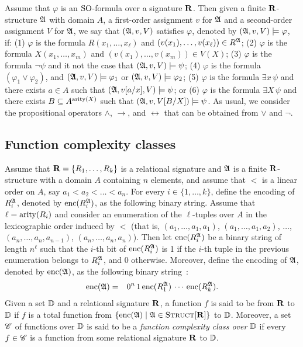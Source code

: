 Assume that $\varphi$ is an ${\rm SO}$-formula over a signature $\mathbf{R}$. Then given a finite $\mathbf{R}$-structure $\mathfrak{A}$ with domain $A$, a first-order assignment $v$ for $\mathfrak{A}$ and a second-order assignment $V$ for $\mathfrak{A}$, we say that $(\mathfrak{A}, v, V)$ satisfies $\varphi$, denoted by $(\mathfrak{A}, v, V) \models \varphi$, if: (1) $\varphi$ is the formula $R(x_1, \ldots, x_\ell)$ and $(v(x_1), \ldots, v(x_\ell)) \in R^{\mathfrak{A}}$; (2) $\varphi$ is the formula $X(x_1, \ldots, x_m)$ and $(v(x_1), \ldots, v(x_m)) \in V(X)$; (3) $\varphi$ is the formula $\neg \psi$ and it not the case that $(\mathfrak{A}, v, V) \models \psi$; (4) $\varphi$ is the formula $(\varphi_1 \vee \varphi_2)$, and $(\mathfrak{A}, v, V) \models \varphi_1$ or $(\mathfrak{A}, v, V) \models \varphi_2$; (5) $\varphi$ is the formula $\exists x \, \psi$ and there exists $a \in A$ such that $(\mathfrak{A}, v[a/x], V) \models \psi$; or (6) $\varphi$ is the formula $\exists X \, \psi$ and there exists $B \subseteq A^{{\rm arity}(X)}$ such that $(\mathfrak{A}, v, V[B/X]) \models \psi$.  As usual, we consider the propositional operators $\wedge$, $\rightarrow$, and $\leftrightarrow$ that can be obtained from $\vee$ and $\neg$. 

\subsection{Function complexity classes}
Assume that $\mathbf{R} = \{R_1, \ldots, R_k\}$ is a relational signature and $\mathfrak{A}$ is a finite $\mathbf{R}$-structure with a domain $A$ containing $n$ elements, and assume that  $<$ is a linear order on $A$, say $a_1 < a_2 < \ldots < a_n$. For every $i \in \{1, \ldots, k\}$, define the encoding of $R_i^{\mathfrak{A}}$, denoted by ${\rm enc}(R_i^{\mathfrak{A}})$, as the following binary string. Assume that $\ell = {\rm arity}(R_i)$ and consider an enumeration of the $\ell$-tuples over $A$ in the lexicographic order induced by $<$ (that is, $(a_1, \ldots, a_1, a_1)$, $(a_1, \ldots, a_1, a_2)$, $\ldots$, $(a_n, \ldots, a_n, a_{n-1})$, $(a_n, \ldots, a_n, a_n)$). Then let ${\rm enc}(R_i^{\mathfrak{A}})$ be a binary string of length $n^\ell$ such that the $i$-th bit of ${\rm enc}(R_i^{\mathfrak{A}})$ is 1 if the $i$-th tuple in the previous enumeration belongs to $R_i^{\mathfrak{A}}$, and 0 otherwise. Moreover, define the encoding of $\mathfrak{A}$, denoted by ${\rm enc}(\mathfrak{A})$, as the following binary string~\cite{L04}:
\begin{eqnarray*}
{\rm enc}(\mathfrak{A}) & = & 0^n \, 1 \, {\rm enc}(R_1^{\mathfrak{A}}) \, \cdots \, {\rm enc}(R_k^{\mathfrak{A}}).
\end{eqnarray*}
Given a set $\mathbb{D}$ and a relational signature $\mathbf{R}$, a function $f$ is said to be from $\mathbf{R}$ to $\mathbb{D}$ if $f$ is a total function from $\{{\rm enc}(\mathfrak{A}) \mid \mathfrak{A} \in \text{\sc Struct}[\mathbf{R}]\}$ to $\mathbb{D}$. Moreover, a set $\mathscr{C}$ of functions over $\mathbb{D}$ is said to be a {\em function complexity class over $\mathbb{D}$} if every $f \in \mathscr{C}$ is a function from some relational signature $\mathbf{R}$ to $\mathbb{D}$.

